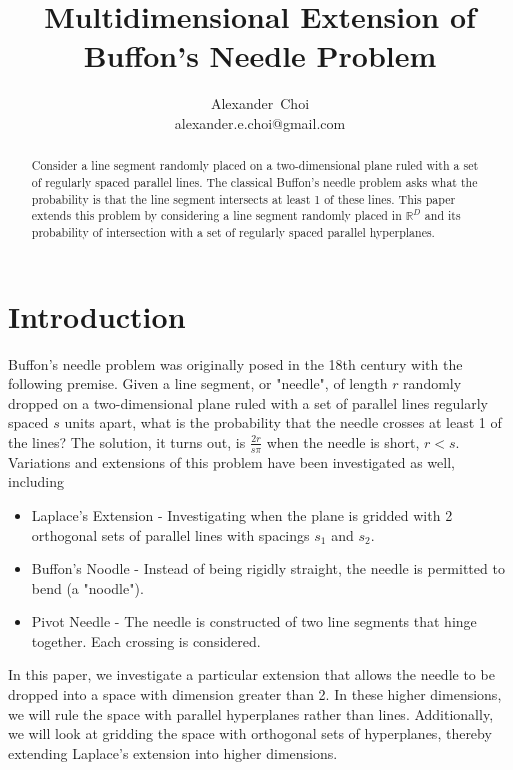 \documentclass{article}
\title{Multidimensional Extension of Buffon's Needle Problem}
\author{ Alexander~Choi\\
	alexander.e.choi@gmail.com
}
\begin{document}
\maketitle

\begin{abstract}
	Consider a line segment randomly placed on a two-dimensional plane ruled with a set of regularly spaced parallel lines. The classical Buffon's needle problem
    asks what the probability is that the line segment intersects at least 1 of these lines. This paper extends this problem by considering a line segment randomly
    placed in $\mathbb{R}^D$ and its probability of intersection with a set of regularly spaced parallel hyperplanes. 
\end{abstract}



\section{Introduction}
Buffon's needle problem was originally posed in the 18th century with the following premise. Given a line segment, or "needle", of length $r$ randomly dropped on a two-dimensional plane
ruled with a set of parallel lines regularly spaced $s$ units apart, what is the probability that the needle crosses at least 1 of the lines? The solution, it turns out, is
$\frac{2r}{s\pi}$ when the needle is short, $r<s$. Variations and extensions of this problem have been investigated as well, including
\begin{itemize}
	\item Laplace's Extension - Investigating when the plane is gridded with 2 orthogonal sets of parallel lines with spacings $s_1$ and $s_2$.
	\item Buffon's Noodle - Instead of being rigidly straight, the needle is permitted to bend (a "noodle").
	\item Pivot Needle - The needle is constructed of two line segments that hinge together. Each crossing is considered.
\end{itemize}

In this paper, we investigate a particular extension that allows the needle to be dropped into a space with dimension greater than 2. In these higher dimensions, we will rule the space
with parallel hyperplanes rather than lines. Additionally, we will look at gridding the space with orthogonal sets of hyperplanes, thereby extending Laplace's extension into higher dimensions.
\end{document}
